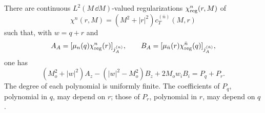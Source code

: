 \begin{lemma}\label{D:subtractions}
There are continuous $L^2(M\,\dd M)$-valued regularizations
$\chi^n_{\rm reg}(r,M)$ of
\begin{equation}\label{D:chi}
 \chi^n(r,M)=(M^2+|r|^2)c_T^{(\bar n)}(M,r)
\end{equation}
such that, with $w=q+r$ and
\begin{equation}\label{D:AB}
A_A=[\mu_n(q)\chi^n_{\rm reg}(r)]_{j_A^{(n)}},\qquad
B_A=[\mu_{\bar n}(r)\chi^{\bar n}_{\rm reg}(q)]_{j_A^{(\bar n)}},
\end{equation}
one has
\begin{equation}\label{D:two-horizon}
 (M_o^2+|w|^2)A_z-(|w|^2-M_o^2)B_z+2M_ow_iB_i
 =P_q+P_r.
\end{equation}
The degree of each polynomial is uniformly finite.  The coefficients
of $P_q$, polynomial in $q$, may depend on $r$; those of $P_r$,
polynomial in $r$, may depend on $q$.
\end{lemma}

